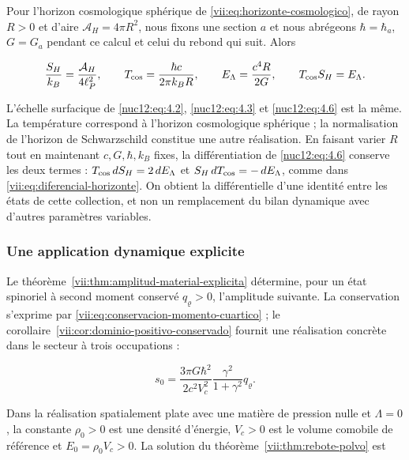 Pour l’horizon cosmologique sphérique de \eqref{vii:eq:horizonte-cosmologico}, de rayon \(R>0\) et d’aire \(\mathcal A_H=4\pi R^2\), nous fixons une section \(a\) et nous abrégeons \(\hbar=\hbar_a\), \(G=G_a\) pendant ce calcul et celui du rebond qui suit. Alors



\begin{equation}
\frac{S_H}{k_B}=\frac{\mathcal A_H}{4\ell_P^2},\qquad
T_{\rm cos}=\frac{\hbar c}{2\pi k_BR},\qquad
E_\Lambda=\frac{c^4R}{2G},\qquad T_{\rm cos}S_H=E_\Lambda .
\label{nuc12:eq:4.6}
\end{equation}



L’échelle surfacique de \eqref{nuc12:eq:4.2}, \eqref{nuc12:eq:4.3} et \eqref{nuc12:eq:4.6} est la même. La température correspond à l’horizon cosmologique sphérique ; la normalisation de l’horizon de Schwarzschild constitue une autre réalisation. En faisant varier \(R\) tout en maintenant \(c,G,\hbar,k_B\) fixes, la différentiation de \eqref{nuc12:eq:4.6} conserve les deux termes : \(T_{\rm cos}\,dS_H=2\,dE_\Lambda\) et \(S_H\,dT_{\rm cos}=-\,dE_\Lambda\), comme dans \eqref{vii:eq:diferencial-horizonte}. On obtient la différentielle d’une identité entre les états de cette collection, et non un remplacement du bilan dynamique avec d’autres paramètres variables.

\subsubsection{Une application dynamique explicite}

Le théorème~\ref{vii:thm:amplitud-material-explicita} détermine, pour un état spinoriel à second moment conservé \(q_\varrho>0\), l’amplitude suivante. La conservation s’exprime par \eqref{vii:eq:conservacion-momento-cuartico} ; le corollaire~\ref{vii:cor:dominio-positivo-conservado} fournit une réalisation concrète dans le secteur à trois occupations :



\begin{equation}
s_0=\frac{3\pi G\hbar^2}{2c^2V_c^2}
\frac{\gamma^2}{1+\gamma^2}q_\varrho .
\label{nuc12:eq:4.7}
\end{equation}



Dans la réalisation spatialement plate avec une matière de pression nulle et \(\Lambda=0\), la constante \(\rho_0>0\) est une densité d’énergie, \(V_c>0\) est le volume comobile de référence et \(E_0=\rho_0V_c>0\). La solution du théorème~\ref{vii:thm:rebote-polvo} est





